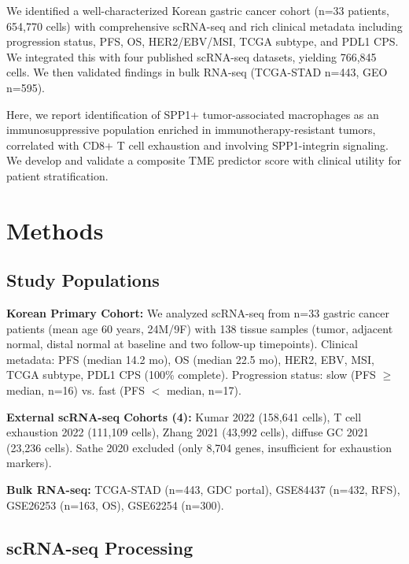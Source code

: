 \documentclass[12pt,twoside]{article}
\begin{document}
We identified a well-characterized Korean gastric cancer cohort (n=33 patients, 654,770 cells) with comprehensive scRNA-seq and rich clinical metadata including progression status, PFS, OS, HER2/EBV/MSI, TCGA subtype, and PDL1 CPS. We integrated this with four published scRNA-seq datasets, yielding 766,845 cells. We then validated findings in bulk RNA-seq (TCGA-STAD n=443, GEO n=595).

Here, we report identification of SPP1+ tumor-associated macrophages as an immunosuppressive population enriched in immunotherapy-resistant tumors, correlated with CD8+ T cell exhaustion and involving SPP1-integrin signaling. We develop and validate a composite TME predictor score with clinical utility for patient stratification.


\section{Methods}

\subsection{Study Populations}

\textbf{Korean Primary Cohort:} We analyzed scRNA-seq from n=33 gastric cancer patients (mean age 60 years, 24M/9F) with 138 tissue samples (tumor, adjacent normal, distal normal at baseline and two follow-up timepoints). Clinical metadata: PFS (median 14.2 mo), OS (median 22.5 mo), HER2, EBV, MSI, TCGA subtype, PDL1 CPS (100\% complete). Progression status: slow (PFS $\geq$ median, n=16) vs. fast (PFS $<$ median, n=17).

\textbf{External scRNA-seq Cohorts (4):} Kumar 2022 (158,641 cells), T cell exhaustion 2022 (111,109 cells), Zhang 2021 (43,992 cells), diffuse GC 2021 (23,236 cells). Sathe 2020 excluded (only 8,704 genes, insufficient for exhaustion markers).

\textbf{Bulk RNA-seq:} TCGA-STAD (n=443, GDC portal), GSE84437 (n=432, RFS), GSE26253 (n=163, OS), GSE62254 (n=300).

\subsection{scRNA-seq Processing}
\end{document}
